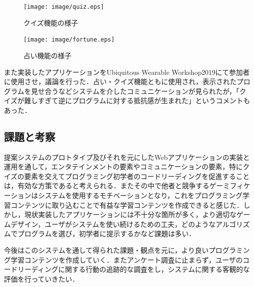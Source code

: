\begin{figure}[H]
  \begin{center}
    \texttt{[image: image/quiz.eps]}
  \end{center}
    \vspace{-8mm} 
  \caption{クイズ機能の様子}
  \label{quiz}
\end{figure}

\begin{figure}[H]
  \begin{center}
    \texttt{[image: image/fortune.eps]}
  \end{center}
    \vspace{-8mm} 
  \caption{占い機能の様子}
  \label{fortune}
\end{figure}

また実装したアプリケーションをUbiquitous Wearable Workshop2019\cite{uww2019}にて参加者に使用させ，議論を行った．占い・クイズ機能ともに使用され，表示されたプログラムを見せ合うなどシステムを介したコミュニケーションが見られたが，「クイズが難しすぎて逆にプログラムに対する抵抗感が生まれた」というコメントもあった．




\subsection{課題と考察}

提案システムのプロトタイプ及びそれを元にしたWebアプリケーションの実装と運用を通して，エンタテインメントの要素やコミュニケーションの要素，特にクイズの要素を交えてプログラミング初学者のコードリーディングを促進することは，有効な方策であると考えられる．またその中で他者と競争するゲーミフィケーションはシステムを使用するモチベーションとなり，これをプログラミング学習コンテンツに取り込むことで有益な学習コンテンツを作成できると感じた．しかし，現状実装したアプリケーションには不十分な箇所が多く，より適切なゲームデザイン，ユーザがシステムを使い続けるための工夫，どのようなアルゴリズムでプログラムを選び，初学者に提示するかなど課題は多い．

今後はこのシステムを通して得られた課題・観点を元に，より良いプログラミング学習コンテンツを作成していく．またアンケート調査に止まらず，ユーザのコードリーディングに関する行動の追跡的な調査をし，システムに関する客観的な評価を行っていきたい．
